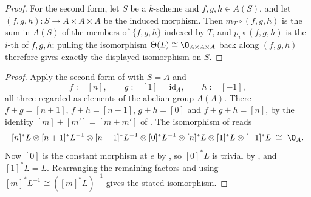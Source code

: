 \begin{proof}
For the second form, let $S$ be a $k$-scheme and $f,g,h\in A(S)$, and let
$(f,g,h)\colon S\to A\times A\times A$ be the induced morphism.  Then
$m_T\circ(f,g,h)$ is the sum in $A(S)$ of the members of $\{f,g,h\}$ indexed by
$T$, and $p_i\circ(f,g,h)$ is the $i$-th of $f,g,h$; pulling the isomorphism
$\Theta(L)\cong\O_{A\times A\times A}$ back along $(f,g,h)$ therefore gives
exactly the displayed isomorphism on $S$.
\end{proof}

\begin{proof}
Apply the second form of  with $S=A$ and
\[
  f:=[n],\qquad g:=[1]=\mathrm{id}_A,\qquad h:=[-1],
\]
all three regarded as elements of the abelian group $A(A)$.  There
$f+g=[n+1]$, $f+h=[n-1]$, $g+h=[0]$ and $f+g+h=[n]$, by the identity
$[m]+[m']=[m+m']$ of .  The isomorphism of
 reads
\[
  [n]^*L\otimes[n+1]^*L^{-1}\otimes[n-1]^*L^{-1}\otimes[0]^*L^{-1}
  \otimes[n]^*L\otimes[1]^*L\otimes[-1]^*L\;\cong\;\O_A .
\]
Now $[0]$ is the constant morphism at $e$ by
, so $[0]^*L$ is trivial by
, and $[1]^*L=L$.  Rearranging the remaining
factors and using $[m]^*L^{-1}\cong([m]^*L)^{-1}$ gives the stated
isomorphism.
\end{proof}

